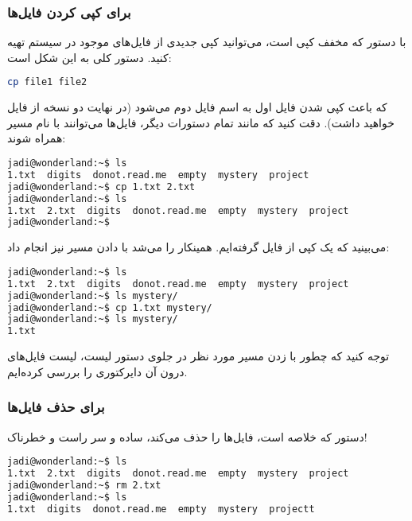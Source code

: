 \subsubsection*{ برای کپی کردن فایل‌ها}
با دستور  که مخفف کپی است، می‌توانید کپی جدیدی از فایل‌های موجود در سیستم تهیه کنید. دستور کلی به این شکل است:

\begin{latin}
\begin{lstlisting}[language=bash,basicstyle=\ttfamily,linewidth=12cm]
cp file1 file2
\end{lstlisting}
\end{latin}

که باعث کپی شدن فایل اول به اسم فایل دوم می‌شود (در نهایت دو نسخه از فایل خواهید داشت). دقت کنید که مانند تمام دستورات دیگر، فایل‌ها می‌توانند با نام مسیر همراه شوند:

\begin{latin}
\begin{lstlisting}[language=bash,basicstyle=\ttfamily,linewidth=12cm]
jadi@wonderland:~$ ls
1.txt  digits  donot.read.me  empty  mystery  project
jadi@wonderland:~$ cp 1.txt 2.txt
jadi@wonderland:~$ ls
1.txt  2.txt  digits  donot.read.me  empty  mystery  project
jadi@wonderland:~$ 
\end{lstlisting}
\end{latin}

می‌بینید که یک کپی از فایل  گرفته‌ایم. همینکار را می‌شد با دادن مسیر نیز انجام داد:

\begin{latin}
\begin{lstlisting}[language=bash,basicstyle=\ttfamily,linewidth=12cm]
jadi@wonderland:~$ ls
1.txt  2.txt  digits  donot.read.me  empty  mystery  project
jadi@wonderland:~$ ls mystery/
jadi@wonderland:~$ cp 1.txt mystery/
jadi@wonderland:~$ ls mystery/
1.txt
\end{lstlisting}
\end{latin}

توجه کنید که چطور با زدن مسیر مورد نظر در جلوی دستور لیست، لیست فایل‌های درون آن دایرکتوری را بررسی کرده‌ایم.
\subsubsection*{ برای حذف فایل‌ها}
دستور  که خلاصه 
 است، فایل‌ها را حذف می‌کند، ساده و سر راست و خطرناک!

\begin{latin}
\begin{lstlisting}[language=bash,basicstyle=\ttfamily,linewidth=12cm]
jadi@wonderland:~$ ls
1.txt  2.txt  digits  donot.read.me  empty  mystery  project
jadi@wonderland:~$ rm 2.txt 
jadi@wonderland:~$ ls
1.txt  digits  donot.read.me  empty  mystery  projectt
\end{lstlisting}
\end{latin}

